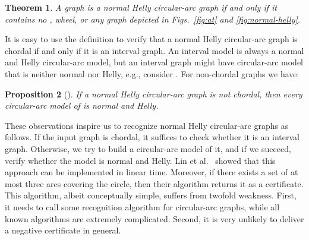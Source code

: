 \documentclass[10pt]{article}
\newtheorem{theorem}{Theorem}[section]
\newtheorem{proposition}[theorem]{Proposition}
\newcommand{\nhcag}{normal Helly circular-arc graph}
\begin{document}
\begin{theorem}\label{thm:characterization}
A graph is a normal Helly circular-arc graph if and only if it
contains no , wheel, or any graph depicted in Figs.~\ref{fig:at}
and \ref{fig:normal-helly}.
\end{theorem}
\begin{figure*}[t]
  \centering
  
  
    
    
  
  \caption{Non-chordal and finite minimal forbidden induced graphs.}
  \label{fig:normal-helly}
\end{figure*}

It is easy to use the definition to verify that a normal Helly
circular-arc graph is chordal if and only if it is an interval graph.
An interval model is always a normal and Helly circular-arc model, but
an interval graph might have circular-arc model that is neither normal
nor Helly, e.g., consider .  For non-chordal graphs we have:
\begin{proposition}[\cite{mckee-03-restricted-cag,lin-13-nhcag-and-subclasses}]
  \label{thm:always-noraml-and-helly}
  If a normal Helly circular-arc graph  is not chordal, then every
  circular-arc model of  is normal and Helly.
\end{proposition}
These observations inspire us to recognize \nhcag s as follows.  If
the input graph is chordal, it suffices to check whether it is an
interval graph.  Otherwise, we try to build a circular-arc model of
it, and if we succeed, verify whether the model is normal and Helly.  Lin
et al.~\cite{lin-13-nhcag-and-subclasses} showed that this approach
can be implemented in linear time.  Moreover, if there exists a set of
at most three arcs covering the circle, then their algorithm returns
it as a certificate.
This algorithm, albeit conceptually simple, suffers from twofold
weakness.  First, it needs to call some recognition algorithm for
circular-arc graphs, while all known algorithms are extremely
complicated.  Second, it is very unlikely to deliver a negative
certificate in general.  
\end{document}
